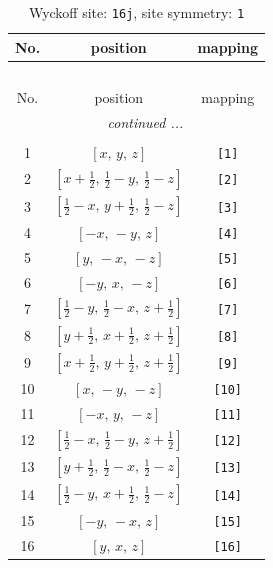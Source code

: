 \documentclass[fleqn,8pt]{jsarticle}
\begin{document}
\begin{longtable}{ccc}
\caption{Wyckoff site: {\tt 16j}, site symmetry: {\tt 1}}
 \\
 \hline \hline
No. & position & mapping \\ \hline \endfirsthead

\multicolumn{2}{l}{\tablename\ \thetable{}} \\
 \hline \hline
No. & position & mapping \\ \hline \endhead

 \hline \hline
\multicolumn{2}{r}{\footnotesize\it continued ...} \\ \endfoot

 \hline \hline
\multicolumn{2}{r}{} \\ \endlastfoot

1 & $\left[ x,\, y,\, z \right]$ & {\tt [1]} \\ \hline
2 & $\left[ x + \frac{1}{2},\, \frac{1}{2} - y,\, \frac{1}{2} - z \right]$ & {\tt [2]} \\ \hline
3 & $\left[ \frac{1}{2} - x,\, y + \frac{1}{2},\, \frac{1}{2} - z \right]$ & {\tt [3]} \\ \hline
4 & $\left[ - x,\, - y,\, z \right]$ & {\tt [4]} \\ \hline
5 & $\left[ y,\, - x,\, - z \right]$ & {\tt [5]} \\ \hline
6 & $\left[ - y,\, x,\, - z \right]$ & {\tt [6]} \\ \hline
7 & $\left[ \frac{1}{2} - y,\, \frac{1}{2} - x,\, z + \frac{1}{2} \right]$ & {\tt [7]} \\ \hline
8 & $\left[ y + \frac{1}{2},\, x + \frac{1}{2},\, z + \frac{1}{2} \right]$ & {\tt [8]} \\ \hline
9 & $\left[ x + \frac{1}{2},\, y + \frac{1}{2},\, z + \frac{1}{2} \right]$ & {\tt [9]} \\ \hline
10 & $\left[ x,\, - y,\, - z \right]$ & {\tt [10]} \\ \hline
11 & $\left[ - x,\, y,\, - z \right]$ & {\tt [11]} \\ \hline
12 & $\left[ \frac{1}{2} - x,\, \frac{1}{2} - y,\, z + \frac{1}{2} \right]$ & {\tt [12]} \\ \hline
13 & $\left[ y + \frac{1}{2},\, \frac{1}{2} - x,\, \frac{1}{2} - z \right]$ & {\tt [13]} \\ \hline
14 & $\left[ \frac{1}{2} - y,\, x + \frac{1}{2},\, \frac{1}{2} - z \right]$ & {\tt [14]} \\ \hline
15 & $\left[ - y,\, - x,\, z \right]$ & {\tt [15]} \\ \hline
16 & $\left[ y,\, x,\, z \right]$ & {\tt [16]} \\
\end{longtable}
\end{document}
